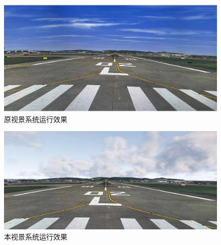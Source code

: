 \begin{figure}[h!]
    \begin{center}
        \includegraphics[width=\textwidth]{pictures/ffs2.png}
        \caption{原视景系统运行效果}
        \label{flightffs}
    \end{center}
\end{figure}
\begin{figure}[h!]
    \begin{center}
        \includegraphics[width=\textwidth]{pictures/ourffs.png}
        \caption{本视景系统运行效果}
        \label{flighttest}
    \end{center}
\end{figure}
